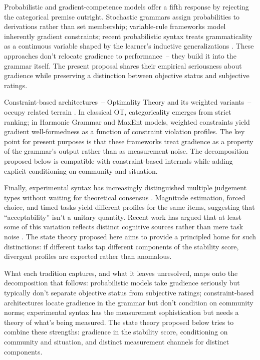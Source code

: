 \documentclass[12pt,letterpaper]{article}
\begin{document}
Probabilistic and gradient-competence models offer a fifth response by rejecting the categorical premise outright. Stochastic grammars assign probabilities to derivations rather than set membership; variable-rule frameworks model inherently gradient constraints; recent probabilistic syntax treats grammaticality as a continuous variable shaped by the learner's inductive generalizations \autocite{bresnan2007, manning2003}. These approaches don't relocate gradience to performance~-- they build it into the grammar itself. The present proposal shares their empirical seriousness about gradience while preserving a distinction between objective status and subjective ratings.

Constraint-based architectures~-- Optimality Theory and its weighted variants~-- occupy related terrain \autocite{legendre2001}. In classical OT, categoricality emerges from strict ranking; in Harmonic Grammar and MaxEnt models, weighted constraints yield gradient well-formedness as a function of constraint violation profiles. The key point for present purposes is that these frameworks treat gradience as a property of the grammar's output rather than as measurement noise. The decomposition proposed below is compatible with constraint-based internals while adding explicit conditioning on community and situation.

Finally, experimental syntax has increasingly distinguished multiple judgement types without waiting for theoretical consensus \autocite{sprouse2013, schutze2016}. Magnitude estimation, forced choice, and timed tasks yield different profiles for the same items, suggesting that \enquote{acceptability} isn't a unitary quantity. Recent work has argued that at least some of this variation reflects distinct cognitive sources rather than mere task noise \autocite{featherston2005}. The state theory proposed here aims to provide a principled home for such distinctions: if different tasks tap different components of the stability score, divergent profiles are expected rather than anomalous.

What each tradition captures, and what it leaves unresolved, maps onto the decomposition that follows: probabilistic models take gradience seriously but typically don't separate objective status from subjective ratings; constraint-based architectures locate gradience in the grammar but don't condition on community norms; experimental syntax has the measurement sophistication but needs a theory of what's being measured. The state theory proposed below tries to combine these strengths: gradience in the stability score, conditioning on community and situation, and distinct measurement channels for distinct components.
\end{document}
